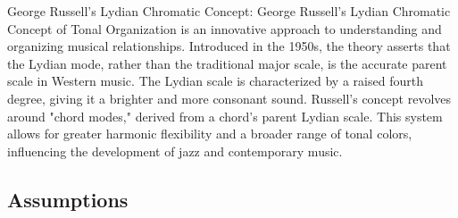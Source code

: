 George Russell's Lydian Chromatic Concept:
George Russell's Lydian Chromatic Concept of Tonal Organization is an innovative approach to understanding and organizing musical relationships. Introduced in the 1950s, the theory asserts that the Lydian mode, rather than the traditional major scale, is the accurate parent scale in Western music. The Lydian scale is characterized by a raised fourth degree, giving it a brighter and more consonant sound. Russell's concept revolves around "chord modes," derived from a chord's parent Lydian scale. This system allows for greater harmonic flexibility and a broader range of tonal colors, influencing the development of jazz and contemporary music.

\subsection{Assumptions}
